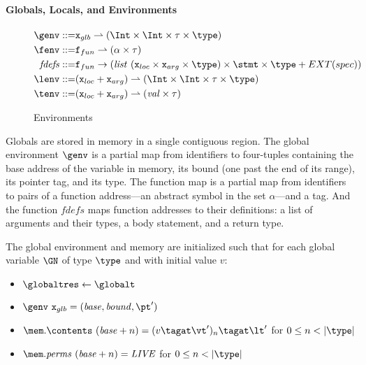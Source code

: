 \documentclass{article}
\begin{document}
\paragraph{Globals, Locals, and Environments}

\begin{figure}[t]
  \begin{align*}
    \genv ::= & \mathtt{x}_{glb} \rightharpoonup (\Int \times \Int \times \tau \times \type) \\
    \fenv ::= & \mathtt{f}_{fun} \rightharpoonup (\alpha \times \tau) \\
    \mathit{fdefs} ::= & \mathtt{f}_{fun} \rightarrow (\mathit{list} ~ (\mathtt{x}_{loc} \times \mathtt{x}_{arg} \times \type) \times \stmt \times \type + EXT(spec)) \\
    \lenv ::= & (\mathtt{x}_{loc} + \mathtt{x}_{arg}) \rightharpoonup (\Int \times \Int \times \tau \times \type) \\
    \tenv ::= & (\mathtt{x}_{loc} + \mathtt{x}_{arg}) \rightharpoonup (\mathit{val} \times \tau) \\
  \end{align*}
  
  \caption{Environments}
  \label{fig:genv}
\end{figure}

Globals are stored in memory in a single contiguous region. The global
environment \(\genv\) is a partial map from identifiers to four-tuples
containing the base address of the variable in memory, its bound (one past
the end of its range), its pointer tag, and its type. The function map
is a partial map from identifiers to pairs of a function address---an
abstract symbol in the set \(\alpha\)---and a tag. And the function
\(\mathit{fdefs}\) maps function addresses to their definitions: a list
of arguments and their types, a body statement, and a return type.

The global environment and memory are initialized such that for each global variable
\(\GN\) of type \(\type\) and with initial value \(v\):
\begin{itemize}
\item \(\globaltres \leftarrow \globalt\)
\item \(\genv ~ \mathtt{x}_{glb} = (\mathit{base},\mathit{bound},\mathit{\pt'})\)
\item \(\mem.\contents ~ (\mathit{base}+n) = (v\tagat\vt')_n \tagat \lt'\) for \(0 \leq n < |\type|\)
\item \(\mem.\mathit{perms} ~ (\mathit{base}+n) = \mathit{LIVE}\) for \(0 \leq n < |\type|\)
\end{itemize}
\end{document}
